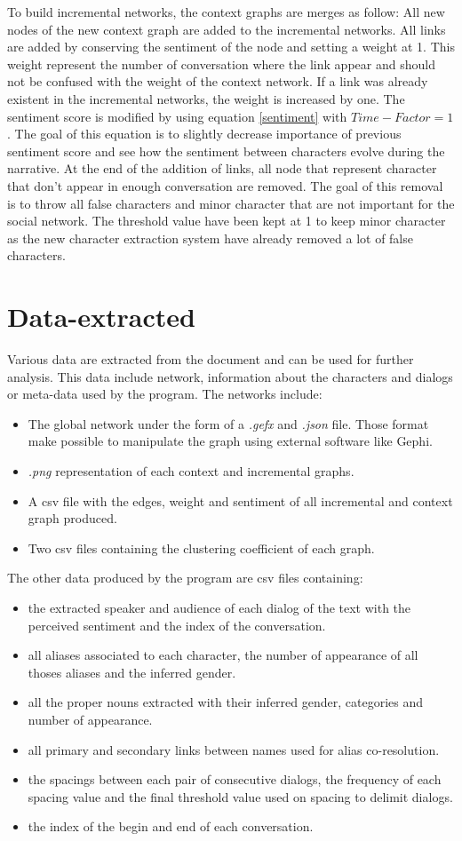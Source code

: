 \documentclass[a4paper, 12pt]{report}
\begin{document}
To build incremental networks, the context graphs are merges as follow: All new nodes of the new context graph are added to the incremental networks. All links are added by conserving the sentiment of the node and setting a weight at 1. This weight represent the number of conversation where the link appear and should not be confused with the weight of the context network. If a link was already existent in the incremental networks, the weight is increased by one. The sentiment score is modified by using equation \ref{sentiment} with $Time-Factor = 1$. The goal of this equation is to slightly decrease importance of previous sentiment score and see how the sentiment between characters evolve during the narrative. At the end of the addition of links, all node that represent character that don't appear in enough conversation are removed. The goal of this removal is to throw all false characters and minor character that are not important for the social network. The threshold value have been kept at 1 to keep minor character as the new character extraction system have already removed a lot of false characters.

\newpage
\section{Data-extracted}
Various data are extracted from the document and can be used for further analysis. This data include network, information about the characters and dialogs or meta-data used by the program.
The networks include:
\begin{itemize}
\item The global network under the form of a \textit{.gefx} and \textit{.json} file. Those format make possible to manipulate the graph using external software like Gephi.
\item \textit{.png} representation of each context and incremental graphs.
\item A csv file with the edges, weight and sentiment of all incremental and context graph produced.
\item Two csv files containing the clustering coefficient of each graph.
\end{itemize}
The other data produced by the program are csv files containing:
\begin{itemize}
\item the extracted speaker and audience of each dialog of the text with the perceived sentiment and the index of the conversation.
\item all aliases associated to each character, the number of appearance of all thoses aliases and the inferred gender.
\item all the proper nouns extracted with their inferred gender, categories and number of appearance.
\item all primary and secondary links between names used for alias co-resolution.
\item the spacings between each pair of consecutive dialogs, the frequency of each spacing value and the final threshold value used on spacing to delimit dialogs.
\item the index of the begin and end of each conversation.
\end{itemize}
\end{document}
